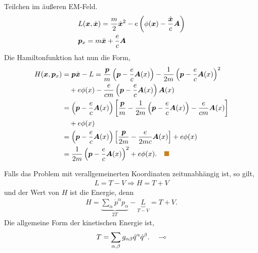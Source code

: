 \begin{bsp}
Teilchen im äußeren EM-Feld.
\begin{align*}
&L(\bm{x},\dot{\bm{x}}) = \frac{m}{2}\dot{\bm{x}}^2 - e\left(\phi(\bm{x}) -
\frac{\dot{\bm{x}}}{c}\bm{A} \right)\\
&\bm{p}_x = m\dot{\bm{x}} + \frac{e}{c}\bm{A}
\end{align*}
Die Hamiltonfunktion hat nun die Form,
\begin{align*}
H(\vec{x},\vec{p}_x) &= \vec{p}\dvec{x} - L =
\frac{\vec{p}}{m}\left(\vec{p}-\frac{e}{c}\vec{A}(x) \right) -
\frac{1}{2m}\left(\vec{p}-\frac{e}{c}\vec{A}(x) \right)^2 \\ &\quad+ e\phi(x) 
- \frac{e}{cm}\left(\vec{p}-\frac{e}{c}\vec{A}(x) \right)\vec{A}(x)\\
&= \left(\vec{p}-\frac{e}{c}\vec{A}(x)
\right)\left[\frac{\vec{p}}{m}-\frac{1}{2m}\left(\vec{p}-\frac{e}{c}\vec{A}(x)
\right) - \frac{e}{cm}\vec{A}(x)\right] \\ &\quad+ e\phi(x)\\
&= \left(\vec{p}-\frac{e}{c}\vec{A}(x) \right)\left[\frac{\vec{p}}{2m} -
\frac{e}{2mc}\vec{A}(x) \right] + e\phi(x)\\
&= \frac{1}{2m}\left(\vec{p}-\frac{e}{c}\vec{A}(x) \right)^2 +
e\phi(x).\bsphere
\end{align*}
\end{bsp}

\begin{bemn}
Falls das Problem mit verallgemeinerten Koordinaten zeitunabhängig ist, so gilt,
\begin{align*}
L = T-V \Rightarrow H=T+V
\end{align*} 
und der Wert von $H$ ist die Energie, denn
\begin{align*}
H= \underbrace{\sum_\alpha \dot{p}^\alpha p_\alpha}_{2T} - \underbrace{L}_{T-V}
= T+V.
\end{align*}
Die allgemeine Form der kinetischen Energie ist,
\begin{align*}
T = \sum_{\alpha,\beta} g_{\alpha\beta} \dot{q}^\alpha\dot{q}^\beta.\quad\multimap
\end{align*}
\end{bemn}

